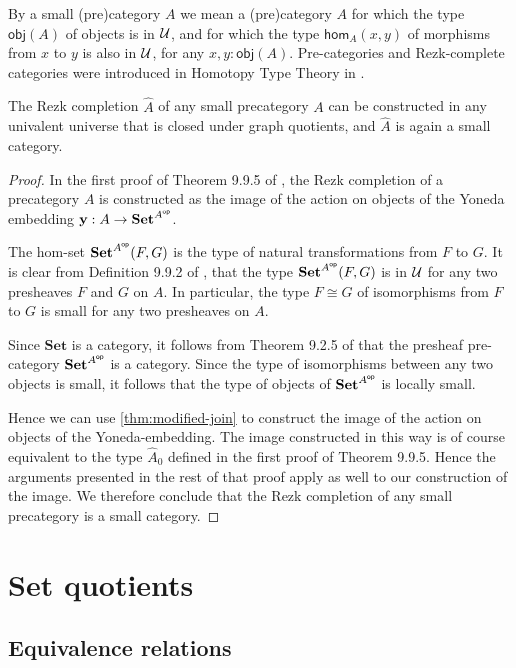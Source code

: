 By a small (pre)category $A$ we mean a (pre)category $A$ for which the type
$\mathsf{obj}(A)$ of objects is in $\mathcal{U}$, and for which the type
$\mathsf{hom}_A(x,y)$ of morphisms from $x$ to $y$ is also in $\mathcal{U}$, for any
$x,y:\mathsf{obj}(A)$. Pre-categories and Rezk-complete categories were introduced
in Homotopy Type Theory in \cite{AKS}.

\begin{cor}\label{cor:rezkcompletion}
The Rezk completion $\hat{A}$ of any small precategory $A$ can be constructed in any 
univalent universe that is closed under graph quotients,
and $\hat{A}$ is again a small category. 
\end{cor}

\begin{proof}
In the first proof of Theorem 9.9.5 of \cite{hottbook}, the Rezk completion of
a precategory $A$ is constructed as the image of the action on objects of the
Yoneda embedding $\mathbf{y}:A\to\mathbf{Set}^{{{A}^\mathsf{op}}}$.

The hom-set $\mathbf{Set}^{{{A}^\mathsf{op}}}(F,G)$ is the type of natural transformations
from $F$ to $G$. It is clear from Definition 9.9.2 of \cite{hottbook}, that the
type $\mathbf{Set}^{{{A}^\mathsf{op}}}(F,G)$ is in $\mathcal{U}$ for any two presheaves $F$ and $G$
on $A$. In particular, the type $F\cong G$ of isomorphisms from $F$ to $G$
is small for any two presheaves on $A$.

Since $\mathbf{Set}$ is a category, it follows from Theorem 9.2.5 of
\cite{hottbook} that the presheaf pre-category $\mathbf{Set}^{{{A}^\mathsf{op}}}$ is a category.
Since the type of isomorphisms between any two objects is
small, it follows that the type of objects of
$\mathbf{Set}^{{{A}^\mathsf{op}}}$ is locally small. 

Hence we can use \autoref{thm:modified-join} to construct the image of the
action on objects of the Yoneda-embedding. The image constructed in this way
is of course equivalent to the type $\hat{A}_0$ defined in the first proof of
Theorem 9.9.5. Hence the arguments presented in the rest of that proof apply
as well to our construction of the image. We therefore conclude that the Rezk completion
of any small precategory is a small category.
\end{proof}

\section{Set quotients}
\subsection{Equivalence relations}

